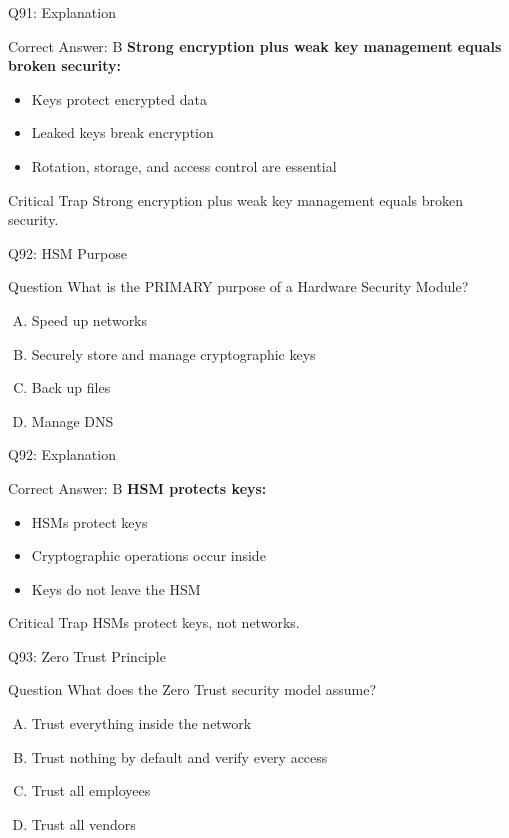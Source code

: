 \documentclass{beamer}
\begin{document}
	\begin{frame}{Q91: Explanation}
		\begin{block}{Correct Answer: B}
			\textbf{Strong encryption plus weak key management equals broken security:}
			\begin{itemize}
				\item Keys protect encrypted data
				\item Leaked keys break encryption
				\item Rotation, storage, and access control are essential
			\end{itemize}
		\end{block}
		\begin{alertblock}{Critical Trap}
			Strong encryption plus weak key management equals broken security.
		\end{alertblock}
	\end{frame}
	
	\begin{frame}{Q92: HSM Purpose}
		\begin{block}{Question}
			What is the PRIMARY purpose of a Hardware Security Module?
		\end{block}
		\begin{enumerate}[(A)]
			\item Speed up networks
			\item Securely store and manage cryptographic keys
			\item Back up files
			\item Manage DNS
		\end{enumerate}
	\end{frame}
	
	\begin{frame}{Q92: Explanation}
		\begin{block}{Correct Answer: B}
			\textbf{HSM protects keys:}
			\begin{itemize}
				\item HSMs protect keys
				\item Cryptographic operations occur inside
				\item Keys do not leave the HSM
			\end{itemize}
		\end{block}
		\begin{alertblock}{Critical Trap}
			HSMs protect keys, not networks.
		\end{alertblock}
	\end{frame}
	
	\begin{frame}{Q93: Zero Trust Principle}
		\begin{block}{Question}
			What does the Zero Trust security model assume?
		\end{block}
		\begin{enumerate}[(A)]
			\item Trust everything inside the network
			\item Trust nothing by default and verify every access
			\item Trust all employees
			\item Trust all vendors
		\end{enumerate}
	\end{frame}
	
\end{document}
